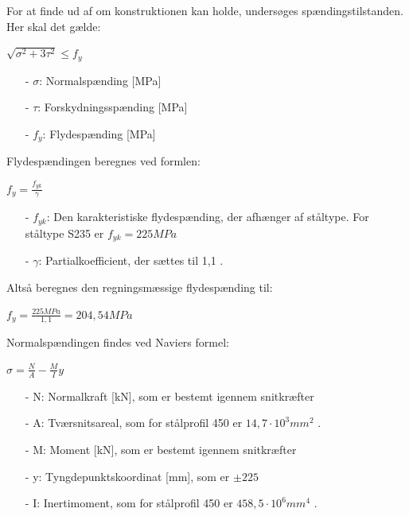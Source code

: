 For at finde ud af om konstruktionen kan holde, undersøges spændingstilstanden. Her skal det gælde:

\begin{center}
	$\sqrt{\sigma^2 + 3\tau^2} \le f_y$ 
\end{center}

\begin{itemize}
	\item[-] $\sigma$: Normalspænding [MPa]
	\item[-] $\tau$: Forskydningsspænding [MPa]
	\item[-] $f_y$: Flydespænding [MPa]
\end{itemize}

Flydespændingen beregnes ved formlen:

\begin{center}
	$f_y = \frac{f_{yk}}{\gamma}$
\end{center}

\begin{itemize}
	\item[-] $f_{yk}$: Den karakteristiske flydespænding, der afhænger af ståltype. For ståltype S235 er $f_{yk} = 225 MPa$
	\item[-] $\gamma$: Partialkoefficient, der sættes til 1,1 \citep[ s. 212]{stabi}.  
\end{itemize}

Altså beregnes den regningsmæssige flydespænding til:

\begin{center}
	$f_y = \frac{225 MPa}{1,\!1} = 204,\!54 MPa$
\end{center}

Normalspændingen findes ved Naviers formel:

\begin{center}
	$\sigma = \frac{N}{A} - \frac{M}{I} y$
\end{center}

\begin{itemize}
	\item[-] N: Normalkraft [kN], som er bestemt igennem snitkræfter
	\item[-] A: Tværsnitsareal, som for stålprofil 450 er $14,\!7 \cdot 10^3 mm^2$ \citep{stabi}. 
	\item[-] M: Moment [kN], som er bestemt igennem snitkræfter
	\item[-] y: Tyngdepunktskoordinat [mm], som er $\pm 225$
	\item[-] I: Inertimoment, som for stålprofil 450 er $458,\!5 \cdot 10^6 mm^4$ \citep{stabi}. 
\end{itemize} 

